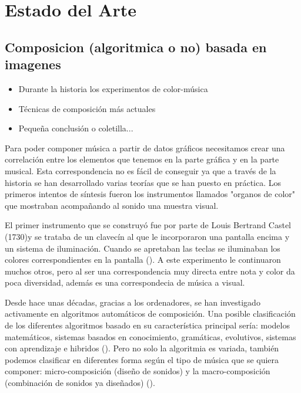 \section{Estado del Arte}
\label{sec:estadodelarte}



\subsection{Composicion (algoritmica o no) basada en imagenes}


\begin{itemize}
\item Durante la historia los experimentos de color-música
\item Técnicas de composición más actuales
\item Pequeña conclusión o coletilla...
\end{itemize}

Para poder componer música a partir de datos gráficos necesitamos crear una correlación entre los elementos que tenemos en la parte gráfica y en la parte musical. Esta correspondencia no es fácil de conseguir ya que a través de la historia se han desarrollado varias teorías que se han puesto en práctica. Los primeros intentos de síntesis fueron los instrumentos llamados "organos de color" que mostraban acompañando al sonido una muestra visual.

El primer instrumento que se construyó fue por parte de Louis Bertrand Castel (1730)y se trataba de un clavecín al que le incorporaron una pantalla encima y un sistema de iluminación. Cuando se apretaban las teclas se iluminaban los colores correspondientes en la pantalla (\cite{OrganosColor}). A este experimento le continuaron muchos otros, pero al ser una correspondencia muy directa entre nota y color da poca diversidad, además es una correspondecia de música a visual.

Desde hace unas décadas, gracias a los ordenadores, se han investigado activamente en algoritmos automáticos de composición. Una posible clasificación de los diferentes algoritmos basado en su característica principal sería: modelos matemáticos, sistemas basados en conocimiento, gramáticas, evolutivos, sistemas con aprendizaje e hibridos (\cite{AIMethodsForComposition}). Pero no solo la algoritmia es variada, también podemos clasificar en diferentes forma según el tipo de música que se quiera componer: micro-composición (diseño de sonidos) y la macro-composición (combinación de sonidos ya diseñados) (\cite{AudioVisualSurvey}).

